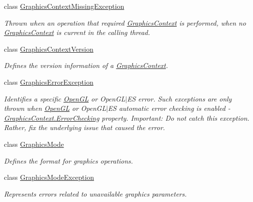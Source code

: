 \begin{DoxyCompactItemize}
class \hyperlink{class_open_t_k_1_1_graphics_1_1_graphics_context_missing_exception}{Graphics\-Context\-Missing\-Exception}
\begin{DoxyCompactList}\small\item\em Thrown when an operation that required \hyperlink{class_open_t_k_1_1_graphics_1_1_graphics_context}{Graphics\-Context} is performed, when no \hyperlink{class_open_t_k_1_1_graphics_1_1_graphics_context}{Graphics\-Context} is current in the calling thread. \end{DoxyCompactList}\item 
class \hyperlink{class_open_t_k_1_1_graphics_1_1_graphics_context_version}{Graphics\-Context\-Version}
\begin{DoxyCompactList}\small\item\em Defines the version information of a \hyperlink{class_open_t_k_1_1_graphics_1_1_graphics_context}{Graphics\-Context}. \end{DoxyCompactList}\item 
class \hyperlink{class_open_t_k_1_1_graphics_1_1_graphics_error_exception}{Graphics\-Error\-Exception}
\begin{DoxyCompactList}\small\item\em Identifies a specific \hyperlink{namespace_open_t_k_1_1_graphics_1_1_open_g_l}{Open\-G\-L} or Open\-G\-L$|$\-E\-S error. Such exceptions are only thrown when \hyperlink{namespace_open_t_k_1_1_graphics_1_1_open_g_l}{Open\-G\-L} or Open\-G\-L$|$\-E\-S automatic error checking is enabled -\/ \hyperlink{class_open_t_k_1_1_graphics_1_1_graphics_context_a8ad06302403c5503b6ba954676523d90}{Graphics\-Context.\-Error\-Checking} property. Important\-: Do {\itshape not} catch this exception. Rather, fix the underlying issue that caused the error. \end{DoxyCompactList}\item 
class \hyperlink{class_open_t_k_1_1_graphics_1_1_graphics_mode}{Graphics\-Mode}
\begin{DoxyCompactList}\small\item\em Defines the format for graphics operations.\end{DoxyCompactList}\item 
class \hyperlink{class_open_t_k_1_1_graphics_1_1_graphics_mode_exception}{Graphics\-Mode\-Exception}
\begin{DoxyCompactList}\small\item\em Represents errors related to unavailable graphics parameters. \end{DoxyCompactList}\item 

\end{DoxyCompactItemize}
